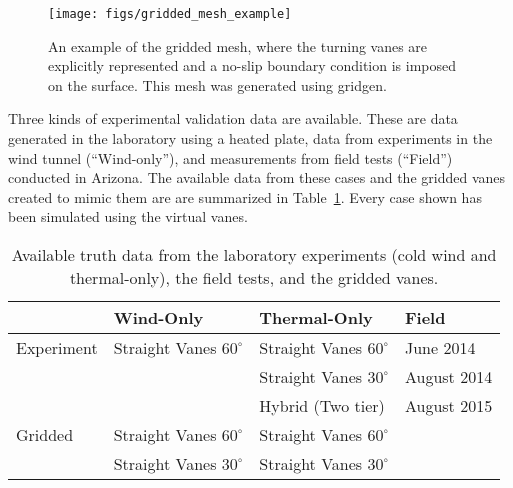  \begin{figure}[!htb]
   \begin{center}
    \texttt{[image: figs/gridded\_mesh\_example]}
    \caption{An example of the gridded mesh, where the turning vanes
    are explicitly represented and a no-slip boundary condition is
    imposed on the surface. This mesh was generated using gridgen.} 
    \label{fig:gridded_mesh}
   \end{center}
 \end{figure}

Three kinds of experimental validation data are available. These are
data generated in the laboratory using a heated plate, data from
experiments in the wind tunnel (``Wind-only''), and measurements from field
tests (``Field'') conducted in Arizona. The available data from
these cases and the gridded vanes created to mimic them are are
summarized in Table~\ref{tab:val_data}. Every case shown has been
simulated using the virtual vanes.   

\begin{table}[h]
\centering
\begin{tabular}{l|l|l|l|}
           & Wind-Only                   & Thermal-Only                & Field  \\
  \hline 
Experiment & Straight Vanes $60^{\circ}$ & Straight Vanes $60^{\circ}$ & June 2014   \\
           &                           & Straight Vanes $30^{\circ}$   & August 2014 \\
           &                           & Hybrid (Two tier)             & August 2015 \\
  \hline 
Gridded    & Straight Vanes $60^{\circ}$ & Straight Vanes $60^{\circ}$ & \\
           & Straight Vanes $30^{\circ}$ & Straight Vanes $30^{\circ}$ & \\
  \hline 
\end{tabular}
  \caption{Available truth data from the laboratory experiments 
    (cold wind and thermal-only), the field tests, and the gridded
 vanes.}  
  \label{tab:val_data}
\end{table}
%
%
%
%
%


%
%
